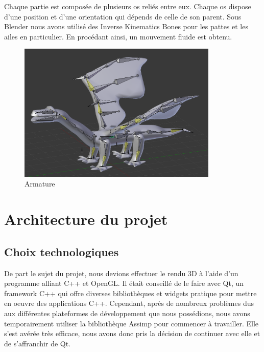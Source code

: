 \documentclass[a4paper]{report}
\begin{document}
Chaque partie est composée de plusieurs os reliés entre eux. Chaque os dispose d'une position et d'une orientation qui dépends de celle de son parent. Sous Blender nous avons utilisé des Inverse Kinematics Bones pour les pattes et les ailes en particulier. En procédant ainsi, un mouvement fluide est obtenu.

\begin{figure}[H]
    \begin{center}
        \includegraphics[width=0.85\textwidth]{armature.png}
        \caption{Armature}
    \end{center}
\end{figure}
\newpage

\chapter{Architecture du projet}
\section{Choix technologiques}
De part le sujet du projet, nous devions effectuer le rendu 3D à l'aide d'un programme alliant C++ et OpenGL. Il était conseillé de le faire avec Qt, un framework C++ qui offre diverses bibliothèques et widgets pratique pour mettre en oeuvre des applications C++. Cependant, après de nombreux problèmes dus aux différentes plateformes de développement que nous possédions, nous avons temporairement utiliser la bibliothèque Assimp pour commencer à travailler. Elle s'est avérée très efficace, nous avons donc pris la décision de continuer avec elle et de s'affranchir de Qt. 
\end{document}
